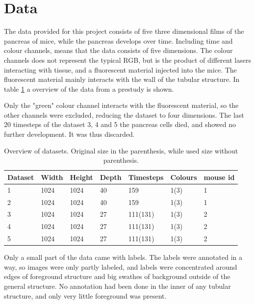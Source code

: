 \section{Data}\label{section:data}
The data provided for this project consists of five three dimensional films of the pancreas of mice, while the pancreas develops over time.
Including time and colour channels, means that the data consists of five dimensions.
The colour channels does not represent the typical RGB, but is the product of different lasers interacting with tissue, and a fluorescent material injected into the mice.
The fluorescent material mainly interacts with the wall of the tubular structure.
In table \ref{tab:data_overview} a overview of the data from a prestudy is shown.

Only the "green" colour channel interacts with the fluorescent material, so the other channels were excluded, reducing the dataset to four dimensions.
The last 20 timesteps of the dataset 3, 4 and 5 the pancreas cells died, and showed no further development.
It was thus discarded.
\begin{table}[h!]
\centering
\begin{tabular}{|l|l|l|l|l|l|l|} \hline
    Dataset & Width & Height & Depth & Timesteps & Colours & mouse id \\ \hline
    1 & 1024 & 1024 & 40 & 159      & 1(3) & 1 \\ \hline
    2 & 1024 & 1024 & 40 & 159      & 1(3) & 1 \\ \hline
    3 & 1024 & 1024 & 27 & 111(131) & 1(3) & 2 \\ \hline
    4 & 1024 & 1024 & 27 & 111(131) & 1(3) & 2 \\ \hline
    5 & 1024 & 1024 & 27 & 111(131) & 1(3) & 2 \\ \hline
\end{tabular}
\caption{Overview of datasets. Original size in the parenthesis, while used
size without parenthesis.}
\label{tab:data_overview}
\end{table}

Only a small part of the data came with labels.
The labels were annotated in a way, so images were only partly labeled, and labels were concentrated around edges of foreground structure and big swathes of background outside of the general structure.
No annotation had been done in the inner of any tubular structure, and only very little foreground was present.


